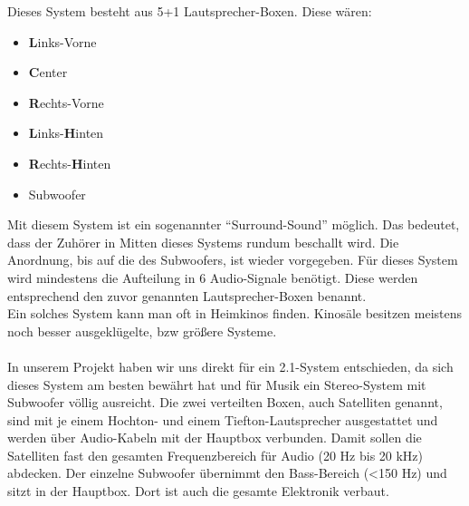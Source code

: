 Dieses System besteht aus 5+1 Lautsprecher-Boxen.
Diese wären:
\begin{itemize}
	\item \textbf{L}inks-Vorne
	\item \textbf{C}enter
	\item \textbf{R}echts-Vorne
	\item \textbf{L}inks-\textbf{H}inten
	\item \textbf{R}echts-\textbf{H}inten
	\item Subwoofer
\end{itemize}
Mit diesem System ist ein sogenannter \enquote{Surround-Sound} möglich.
Das bedeutet, dass der Zuhörer in Mitten dieses Systems rundum beschallt wird.
Die Anordnung, bis auf die des Subwoofers, ist wieder vorgegeben.
Für dieses System wird mindestens die Aufteilung in 6 Audio-Signale benötigt.
Diese werden entsprechend den zuvor genannten Lautsprecher-Boxen benannt.\\
Ein solches System kann man oft in Heimkinos finden.
Kinosäle besitzen meistens noch besser ausgeklügelte, bzw größere Systeme.
\\ \\


In unserem Projekt haben wir uns direkt für ein 2.1-System entschieden, da sich dieses System am besten bewährt hat und für Musik ein Stereo-System mit Subwoofer völlig ausreicht.
Die zwei verteilten Boxen, auch Satelliten genannt, sind mit je einem Hochton- und einem Tiefton-Lautsprecher ausgestattet und werden über Audio-Kabeln mit der Hauptbox verbunden.
Damit sollen die Satelliten fast den gesamten Frequenzbereich für Audio (20 Hz bis 20 kHz) abdecken.
Der einzelne Subwoofer übernimmt den Bass-Bereich (<150 Hz) und sitzt in der Hauptbox.
Dort ist auch die gesamte Elektronik verbaut.


\newpage
